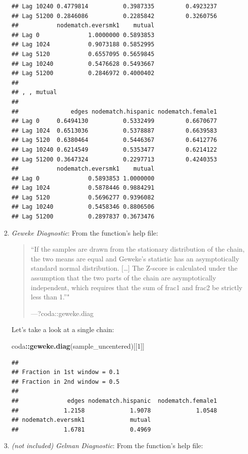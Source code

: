 \documentclass[]{book}
\newenvironment{Shaded}{\begin{snugshade}}{\end{snugshade}}
\newcommand{\KeywordTok}[1]{\textcolor[rgb]{0.13,0.29,0.53}{\textbf{#1}}}
\newcommand{\DecValTok}[1]{\textcolor[rgb]{0.00,0.00,0.81}{#1}}
\newcommand{\OperatorTok}[1]{\textcolor[rgb]{0.81,0.36,0.00}{\textbf{#1}}}
\newcommand{\NormalTok}[1]{#1}
\theoremstyle{definition}
\theoremstyle{definition}
\theoremstyle{definition}
\theoremstyle{remark}
\begin{document}
\begin{enumerate}
\begin{verbatim}
## Lag 10240 0.4779814          0.3987335         0.4923237
## Lag 51200 0.2846086          0.2285842         0.3260756
##           nodematch.eversmk1    mutual
## Lag 0              1.0000000 0.5893853
## Lag 1024           0.9073188 0.5852995
## Lag 5120           0.6557095 0.5659845
## Lag 10240          0.5476628 0.5493667
## Lag 51200          0.2846972 0.4000402
## 
## , , mutual
## 
##               edges nodematch.hispanic nodematch.female1
## Lag 0     0.6494130          0.5332499         0.6670677
## Lag 1024  0.6513036          0.5378887         0.6639583
## Lag 5120  0.6380464          0.5446367         0.6412776
## Lag 10240 0.6214549          0.5353477         0.6214122
## Lag 51200 0.3647324          0.2297713         0.4240353
##           nodematch.eversmk1    mutual
## Lag 0              0.5893853 1.0000000
## Lag 1024           0.5878446 0.9884291
## Lag 5120           0.5696277 0.9396082
## Lag 10240          0.5458346 0.8806506
## Lag 51200          0.2897837 0.3673476
\end{verbatim}
\item
  \emph{Geweke Diagnostic}: From the function's help file:

  \begin{quote}
  ``If the samples are drawn from the stationary distribution of the
  chain, the two means are equal and Geweke's statistic has an
  asymptotically standard normal distribution. {[}\ldots{}{]} The
  Z-score is calculated under the assumption that the two parts of the
  chain are asymptotically independent, which requires that the sum of
  frac1 and frac2 be strictly less than 1.''"

  ---?coda::geweke.diag
  \end{quote}

  Let's take a look at a single chain:

\begin{Shaded}
\begin{Highlighting}[]
\NormalTok{coda}\OperatorTok{::}\KeywordTok{geweke.diag}\NormalTok{(sample_uncentered)[[}\DecValTok{1}\NormalTok{]]}
\end{Highlighting}
\end{Shaded}

\begin{verbatim}
## 
## Fraction in 1st window = 0.1
## Fraction in 2nd window = 0.5 
## 
##              edges nodematch.hispanic  nodematch.female1 
##             1.2158             1.9078             1.0548 
## nodematch.eversmk1             mutual 
##             1.6781             0.4969
\end{verbatim}
\item
  \emph{(not included) Gelman Diagnostic}: From the function's help
  file:


\end{enumerate}
\end{document}
